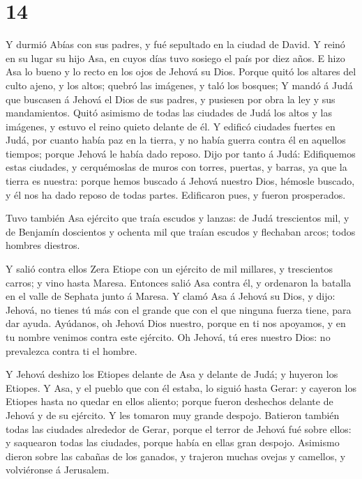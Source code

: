 \hypertarget{section-13}{%
\section{14}\label{section-13}}

 Y durmió Abías con sus padres, y fué sepultado en la ciudad
de David. Y reinó en su lugar su hijo Asa, en cuyos días tuvo sosiego el
país por diez años.  E hizo Asa lo bueno y lo recto en los
ojos de Jehová su Dios.  Porque quitó los altares del culto
ajeno, y los altos; quebró las imágenes, y taló los bosques;
 Y mandó á Judá que buscasen á Jehová el Dios de sus padres,
y pusiesen por obra la ley y sus mandamientos.  Quitó
asimismo de todas las ciudades de Judá los altos y las imágenes, y
estuvo el reino quieto delante de él.  Y edificó ciudades
fuertes en Judá, por cuanto había paz en la tierra, y no había guerra
contra él en aquellos tiempos; porque Jehová le había dado reposo.
 Dijo por tanto á Judá: Edifiquemos estas ciudades, y
cerquémoslas de muros con torres, puertas, y barras, ya que la tierra es
nuestra: porque hemos buscado á Jehová nuestro Dios, hémosle buscado, y
él nos ha dado reposo de todas partes. Edificaron pues, y fueron
prosperados.

 Tuvo también Asa ejército que traía escudos y lanzas: de
Judá trescientos mil, y de Benjamín doscientos y ochenta mil que traían
escudos y flechaban arcos; todos hombres diestros.

 Y salió contra ellos Zera Etiope con un ejército de mil
millares, y trescientos carros; y vino hasta Maresa. 
Entonces salió Asa contra él, y ordenaron la batalla en el valle de
Sephata junto á Maresa.  Y clamó Asa á Jehová su Dios, y
dijo: Jehová, no tienes tú más con el grande que con el que ninguna
fuerza tiene, para dar ayuda. Ayúdanos, oh Jehová Dios nuestro, porque
en ti nos apoyamos, y en tu nombre venimos contra este ejército. Oh
Jehová, tú eres nuestro Dios: no prevalezca contra ti el hombre.

 Y Jehová deshizo los Etiopes delante de Asa y delante de
Judá; y huyeron los Etiopes.  Y Asa, y el pueblo que con él
estaba, lo siguió hasta Gerar: y cayeron los Etiopes hasta no quedar en
ellos aliento; porque fueron deshechos delante de Jehová y de su
ejército. Y les tomaron muy grande despojo.  Batieron
también todas las ciudades alrededor de Gerar, porque el terror de
Jehová fué sobre ellos: y saquearon todas las ciudades, porque había en
ellas gran despojo.  Asimismo dieron sobre las cabañas de
los ganados, y trajeron muchas ovejas y camellos, y volviéronse á
Jerusalem.

